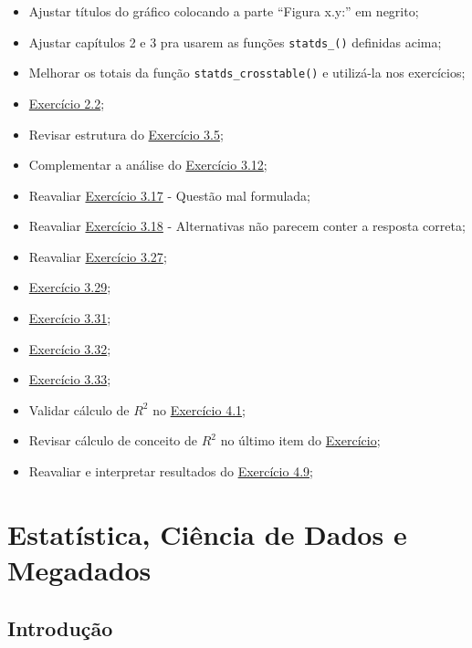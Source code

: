 \documentclass[
]{latex/krantz}
\providecommand{\tightlist}{%
  \setlength{\itemsep}{0pt}\setlength{\parskip}{0pt}}
\theoremstyle{definition}
\theoremstyle{definition}
\theoremstyle{definition}
\theoremstyle{definition}
\theoremstyle{remark}
\begin{document}
\begin{itemize}
\tightlist
\item
  Ajustar títulos do gráfico colocando a parte ``Figura x.y:'' em negrito;
\item
  Ajustar capítulos 2 e 3 pra usarem as funções \texttt{statds\_()} definidas acima;
\item
  Melhorar os totais da função \texttt{statds\_crosstable()} e utilizá-la nos exercícios;
\item
  \protect\hyperlink{exr2-2}{Exercício 2.2};
\item
  Revisar estrutura do \protect\hyperlink{exr3-5}{Exercício 3.5};
\item
  Complementar a análise do \protect\hyperlink{exr3-12}{Exercício 3.12};
\item
  Reavaliar \protect\hyperlink{exr3-17}{Exercício 3.17} - Questão mal formulada;
\item
  Reavaliar \protect\hyperlink{exr3-18}{Exercício 3.18} - Alternativas não parecem conter a resposta correta;
\item
  Reavaliar \protect\hyperlink{exr3-27}{Exercício 3.27};
\item
  \protect\hyperlink{exr3-29}{Exercício 3.29};
\item
  \protect\hyperlink{exr3-31}{Exercício 3.31};
\item
  \protect\hyperlink{exr3-32}{Exercício 3.32};
\item
  \protect\hyperlink{exr3-33}{Exercício 3.33};
\item
  Validar cálculo de \(R^2\) no \protect\hyperlink{exr4-1}{Exercício 4.1};
\item
  Revisar cálculo de conceito de \(R^2\) no último item do \protect\hyperlink{exr4-1}{Exercício};
\item
  Reavaliar e interpretar resultados do \protect\hyperlink{exr4-9}{Exercício 4.9};
\end{itemize}

\mainmatter

\hypertarget{estatuxedstica-ciuxeancia-de-dados-e-megadados}{%
\chapter{Estatística, Ciência de Dados e Megadados}\label{estatuxedstica-ciuxeancia-de-dados-e-megadados}}

\hypertarget{introduuxe7uxe3o}{%
\section{Introdução}\label{introduuxe7uxe3o}}
\end{document}
